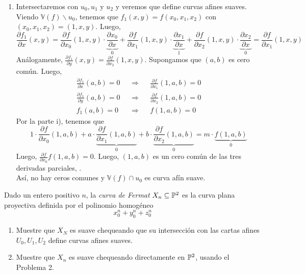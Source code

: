 \begin{sol}
\begin{enumerate}
		\item Intersectaremos con $u_0, u_1$ y $u_2$ y veremos que define curvas afines suaves. \\
		      Viendo $\mathbb{V}(f) \backslash u_0$, tenemos que $f_1(x, y) = f(x_0, x_1, x_2)$ con $(x_0, x_1, x_2) = (1, x, y).$ Luego,
		      $$\frac{\partial f_1}{\partial x}(x, y) = \frac{\partial f}{\partial x_0}(1, x, y) \cdot \underbrace{\frac{\partial x_0}{\partial x}}_{0} + \frac{\partial f}{\partial x_1}(1, x, y) \cdot \underbrace{\frac{\partial x_1}{\partial x}}_{1} + \frac{\partial f}{\partial x_2}(1, x, y) \cdot \underbrace{\frac{\partial x_2}{\partial x}}_{0} = \frac{\partial f}{\partial x_1}(1, x, y)$$
		      Análogamente, $\frac{\partial f_1}{\partial y}(x, y) = \frac{\partial f}{\partial x_2}(1, x, y)$. Supongamos que $(a, b)$ es cero común. Luego,
		      \begin{align*}
			      \frac{\partial f_1}{\partial x} (a, b) = 0 &  & \Rightarrow &  & \frac{\partial f}{\partial x_1} (1, a, b) = 0 \\
			      \frac{\partial f_1}{\partial y} (a, b) = 0 &  & \Rightarrow &  & \frac{\partial f}{\partial x_2} (1, a, b) = 0 \\
			      f_1 (a, b) = 0                             &  & \Rightarrow &  & f (1, a, b) = 0
		      \end{align*}
		      Por la parte i), tenemos que
		      $$1 \cdot \frac{\partial f}{\partial x_0}(1, a, b) + a \cdot \underbrace{\frac{\partial f}{\partial x_1}(1, a, b)}_{0} + b \cdot \underbrace{\frac{\partial f}{\partial x_2}(1, a, b)}_{0} = m \cdot \underbrace{f(1, a, b)}_{0}$$
		      Luego, $\frac{\partial f}{\partial x_0} f(1, a, b) = 0$. Luego, $(1, a, b)$ es un cero común de las tres derivadas parciales, \nope. \\
		      Así, no hay ceros comunes y $\mathbb{V}(f) \cap u_0$ es curva afín suave.
	\end{enumerate}
\end{sol}

\begin{prob}[2 pts. c/u]
	Dado un entero positivo $n$, la \textit{curva de Fermat} $X_n\subseteq\mathbb{P}^2$ es la curva plana proyectiva definida por el polinomio homogéneo
	\[x_0^n+y_0^n+z_0^n\]
	\begin{enumerate}
		\item Muestre que $X_N$ es suave chequeando que su intersección con las cartas afines $U_0,U_1,U_2$ define curvas afines suaves.
		\item Muestre que $X_n$ es suave chequeando directamente en $\mathbb{P}^2$, usando el Problema 2.
	\end{enumerate}
\end{prob}

